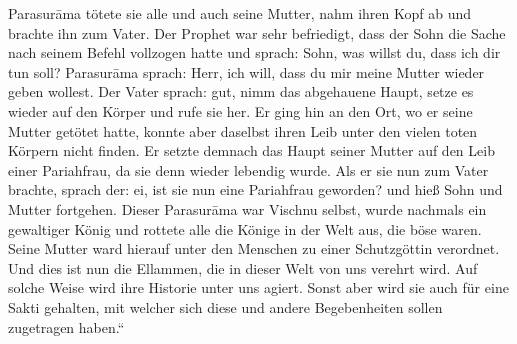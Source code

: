\documentclass{article}
\begin{document}
Parasur\={a}ma tötete sie alle und auch seine Mutter, nahm ihren Kopf ab und brachte ihn zum Vater. Der Prophet war sehr befriedigt, dass der Sohn die Sache nach seinem Befehl vollzogen hatte und sprach: Sohn, was willst du, dass ich dir tun soll? Parasur\={a}ma sprach: Herr, ich will, dass du mir meine Mutter wieder geben wollest. Der Vater sprach: gut, nimm das abgehauene Haupt, setze es wieder auf den Körper und rufe sie her. Er ging hin an den Ort, wo er seine Mutter getötet hatte, konnte aber daselbst ihren Leib unter den vielen toten Körpern nicht finden. Er setzte demnach das Haupt seiner Mutter auf den Leib einer Pariahfrau, da sie denn wieder lebendig wurde. Als er sie nun zum Vater brachte, sprach der: ei, ist sie nun eine Pariahfrau geworden? und hieß Sohn und Mutter fortgehen. Dieser Parasur\={a}ma war Vischnu selbst, wurde nachmals ein gewaltiger König und rottete alle die Könige in der Welt aus, die böse waren. Seine Mutter ward hierauf unter den Menschen zu einer Schutzgöttin verordnet. Und dies ist nun die Ellammen, die in dieser Welt von uns verehrt wird. Auf solche Weise wird ihre Historie unter uns agiert. Sonst aber wird sie auch für eine Sakti gehalten, mit welcher sich diese und andere Begebenheiten sollen zugetragen haben.“

\begin{center}
\end{center}
\end{document}
